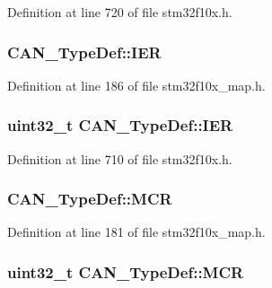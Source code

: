 Definition at line 720 of file stm32f10x.\+h.

\subsubsection[{\texorpdfstring{I\+ER}{IER}}]{ C\+A\+N\+\_\+\+Type\+Def\+::\+I\+ER}\hypertarget{struct_c_a_n___type_def_a5cbdefac1fbf6721819a97fb8445305a}{}\label{struct_c_a_n___type_def_a5cbdefac1fbf6721819a97fb8445305a}


Definition at line 186 of file stm32f10x\+\_\+map.\+h.

\subsubsection[{\texorpdfstring{I\+ER}{IER}}]{ {\bf uint32\+\_\+t} C\+A\+N\+\_\+\+Type\+Def\+::\+I\+ER}\hypertarget{struct_c_a_n___type_def_a530babbc4b9584c93a1bf87d6ce8b8dc}{}\label{struct_c_a_n___type_def_a530babbc4b9584c93a1bf87d6ce8b8dc}


Definition at line 710 of file stm32f10x.\+h.

\subsubsection[{\texorpdfstring{M\+CR}{MCR}}]{ C\+A\+N\+\_\+\+Type\+Def\+::\+M\+CR}\hypertarget{struct_c_a_n___type_def_aed6b6f06cd9fb95ab8ca56386a4e2808}{}\label{struct_c_a_n___type_def_aed6b6f06cd9fb95ab8ca56386a4e2808}


Definition at line 181 of file stm32f10x\+\_\+map.\+h.

\subsubsection[{\texorpdfstring{M\+CR}{MCR}}]{ {\bf uint32\+\_\+t} C\+A\+N\+\_\+\+Type\+Def\+::\+M\+CR}\hypertarget{struct_c_a_n___type_def_a1282eee79a22003257a7a5daa7f4a35f}{}\label{struct_c_a_n___type_def_a1282eee79a22003257a7a5daa7f4a35f}


